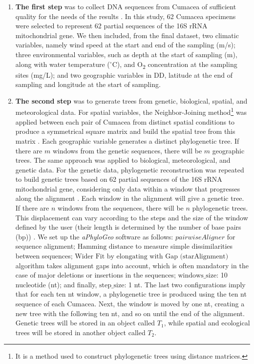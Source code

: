 \begin{enumerate}
\item \textbf{The first step} was to collect DNA sequences from Cumacea of sufficient quality for the needs of the results \citep{koshkarov_phylogeography_2022, li2023aphylogeo, li2024host}. In this study, 62 Cumacea specimens were selected to represent 62 partial sequences of the 16S rRNA mitochondrial gene. We then included, from the final dataset, two climatic variables, namely wind speed at the start and end of the sampling (m/s); three environmental variables, such as depth at the start of sampling (m), along with water temperature ($^\circ$C), and O\textsubscript{2} concentration at the sampling sites (mg/L); and two geographic variables in DD, latitude at the end of sampling and longitude at the start of sampling.

\item \textbf{The second step} was to generate trees from genetic, biological, spatial, and meteorological data. For spatial variables, the {Neighbor-Joining method}\footnote{It is a method used to construct phylogenetic trees using distance matrices.} was applied between each pair of Cumacea from distinct spatial conditions to produce a symmetrical square matrix and build the spatial tree from this matrix \citep{koshkarov_phylogeography_2022}. Each geographic variable generates a distinct phylogenetic tree. If there are $m$ windows from the genetic sequences, there will be $m$ geographic trees. The same approach was applied to biological, meteorological, and genetic data. For the genetic data, phylogenetic reconstruction was repeated to build genetic trees based on 62 partial sequences of the 16S rRNA mitochondrial gene, considering only data within a window that progresses along the alignment \citep{koshkarov_phylogeography_2022, li2023aphylogeo, li2024host}. Each window in the alignment will give a genetic tree. If there are $n$ windows from the sequences, there will be $n$ phylogenetic trees. This displacement can vary according to the steps and the size of the window defined by the user (their length is determined by the number of base pairs (bp)) \citep{koshkarov_phylogeography_2022, li2023aphylogeo, li2024host}. We set up the \textit{aPhyloGeo} software as follows: $pairwiseAligner$ for sequence alignment; $\text{Hamming distance}$ to measure simple dissimilarities between sequences; $\text{Wider Fit by elongating with Gap (starAlignment)}$ algorithm takes alignment gaps into account, which is often mandatory in the case of major deletions or insertions in the sequences; $\text{windows\_size}$: 10 nucleotide (nt); and finally, $\text{step\_size}$: 1 nt. The last two configurations imply that for each ten nt window, a phylogenetic tree is produced using the ten nt sequence of each Cumacea. Next, the window is moved by one nt, creating a new tree with the following ten nt, and so on until the end of the alignment. Genetic trees will be stored in an object called $T_1$, while spatial and ecological trees will be stored in another object called $T_2$.


\end{enumerate}

